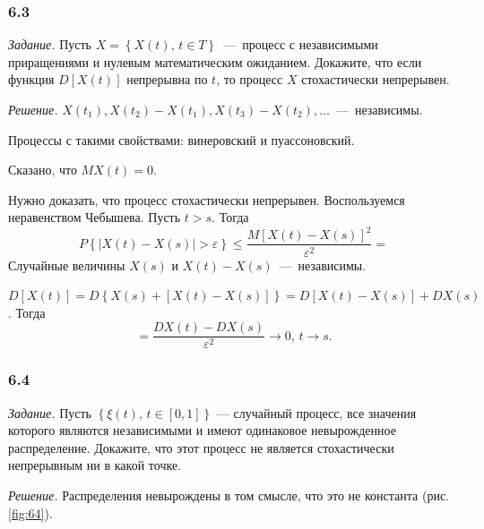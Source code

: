 \subsubsection*{6.3}

\textit{Задание.}
Пусть $X = \left\{ X \left( t \right), \, t \in T \right\} $~---~процесс с
независимыми приращениями и нулевым математическим ожиданием.
Докажите,
что если функция $D \left[ X \left( t \right) \right] $ непрерывна по $t$,
то процесс $X$ стохастически непрерывен.

\textit{Решение.}
$X \left( t_1 \right), X \left( t_2 \right) - X \left( t_1 \right),
  X \left( t_3 \right) - X \left( t_2 \right), \dotsc $~---~независимы.

Процессы с такими свойствами: винеровский и пуассоновский.

Сказано, что $MX \left( t \right) = 0$.

Нужно доказать, что процесс стохастически непрерывен.
Воспользуемся неравенством Чебышева.
Пусть $t > s$.
Тогда
\begin{equation*}
  P \left\{
    \left| X \left( t \right) - X \left( s \right) \right| > \varepsilon
  \right\} \leq
  \frac{M \left[ X \left( t \right) - X \left( s \right) \right]^2}{ \varepsilon^2} =
\end{equation*}
Случайные величины $X \left( s \right) $ и
$X \left( t \right) - X \left( s \right) $~---~независимы.

$D \left[ X \left( t \right) \right] =
  D \left\{ X \left( s \right) +
  \left[ X \left( t \right) - X \left( s \right) \right] \right\} =
  D \left[ X \left( t \right) - X \left( s \right) \right] +
  DX \left( s \right) $.
Тогда
\begin{equation*}
  = \frac{DX \left( t \right) - DX \left( s \right) }{ \varepsilon^2} \to
  0, \,
  t \to s.
\end{equation*}

\subsubsection*{6.4}

\textit{Задание.}
Пусть $ \left\{ \xi \left( t \right), \, t \in \left[ 0, 1 \right] \right\} $ ---
случайный процесс, все значения которого являются независимыми и имеют одинаковое невырожденное
распределение.
Докажите, что этот процесс не является стохастически непрерывным ни в какой точке.

\textit{Решение.}
Распределения невырождены в том смысле, что это не константа (рис. \ref{fig:64}).

